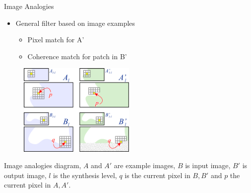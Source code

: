 \documentclass{beamer}
\begin{document}
\begin{frame}{Image Analogies}

\begin{itemize}
\setlength\itemsep{0.5em}
\item General filter based on image examples
	\begin{itemize}
	\setlength\itemsep{0.5em}
	\item Pixel match for A'
	\item Coherence match for patch in B'   
	\end{itemize}
\end{itemize}

\begin{multicols}{2}
	\begin{figure}
        \centering
        \includegraphics[width=0.5\textwidth]{img/ia_diagram}        
	\end{figure}
	
	\vfill
	\columnbreak
	\vspace*{\fill}
	\footnotesize{Image analogies diagram, $A$ and $A'$ are example images, $B$ is input image, $B'$ is output image, $l$ is the synthesis level, $q$ is the current pixel in $B,B'$ and $p$ the current pixel in $A,A'$.}
\end{multicols}

\end{frame}

\end{document}
